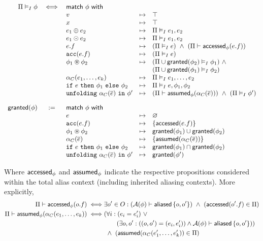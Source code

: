 \begin{align*}
\begin{array}{rclcl}
\Pi \frames \phi &\iff& \tsf{match} \ \phi \ \tsf{with} &&
\\
&& v &\mt&
  \top
\\
&& x &\mt&
  \top
\\
&& e_1 \oplus e_2 &\mt&
  \Pi \frames e_1, e_2
\\
&& e_1 \odot e_2 &\mt&
  \Pi \frames e_1, e_2
\\
&& e.f &\mt&
  (\Pi \frames e) \ \land \ (\Pi \entails \accessed_\phi(e.f))
\\
&& \cacc(e.f) &\mt&
  (\Pi \frames e)
\\
&& \phi_1 \circledast \phi_2 &\mt&
  (\Pi \cup \granted(\phi_2) \frames \phi_1) \ \land \\ &&&&
  (\Pi \cup \granted(\phi_1) \frames \phi_2)
\\
&& \alpha_C(e_1, \dots, e_k) &\mt&
  \Pi \frames e_1, \dots, e_2
\\
&& \cif \ e \ \cthen \ \phi_1 \ \celse \ \phi_2 &\mt&
  \Pi \frames e, \phi_1, \phi_2
\\
&& \cunfolding \ \alpha_C(\vec{e}) \ \cin \ \phi\p &\mt&
  (\Pi \entails \assumed_\phi(\alpha_C(\vec{e}))) \ \land \
  (\Pi \frames \phi\p)
%
\\[1em]
%
\granted(\phi) &:=& \tsf{match} \ \phi \ \tsf{with} &&
\\
&& e &\mt&
  \empty
\\
&& \cacc(e.f) &\mt&
  \set{ \accessed(e.f) }
\\
&& \phi_1 \circast \phi_2 &\mt&
  \granted(\phi_1) \cup \granted(\phi_2)
\\
&& \alpha_C(\vec{e}) &\mt&
  \set{ \assumed(\alpha_C(\vec{e})) }
\\
&& \cif \ e \ \cthen \ \phi_1 \ \celse \ \phi_2 &\mt&
  \granted(\phi_1) \cap \granted(\phi_2)
\\
&& \cunfolding \ \alpha_C(\vec{e}) \ \cin \ \phi\p &\mt&
  \granted(\phi\p)
\end{array}
\end{align*}

\noindent
Where $\textsf{accessed}_\phi$ and $\textsf{assumed}_\phi$ indicate the respective propositions considered within the total alias context (including inherited aliasing contexts). More explicitly,
\begin{align*}
\Pi \vdash \textsf{accessed}_\phi(o.f) \iff &
  \exists o^\prime \in O :
  (\mathcal{A}(\phi) \vdash \textsf{aliased}\left\{ o, o^\prime \right\}) \ \land \
  (\textsf{accessed}(o^\prime.f) \in \Pi)
\\
\Pi \vdash \textsf{assumed}_\phi(\alpha_C(e_1, \dots, e_k)) \iff &
  (\forall i :
    (e_i = e^\prime_i) \ \lor \\ & \hspace{2em}
    (\exists o, o^\prime :
      ((o, o^\prime) = (e_i, e^\prime_i)) \land
      \mathcal{A}(\phi) \vdash \textsf{aliased}\left\{ o, o^\prime \right\})
  )
  \\ & \ \land \
  (\textsf{assumed}(\alpha_C(e^\prime_1, \dots, e^\prime_k)) \in \Pi)
\end{align*}

